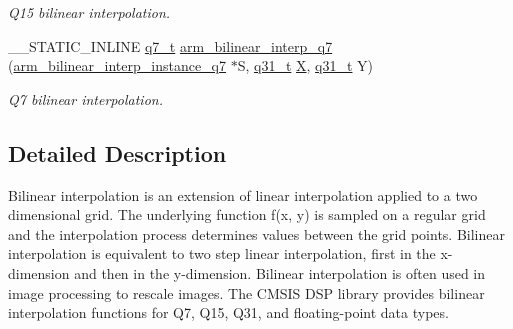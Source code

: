 \begin{DoxyCompactItemize}
\begin{DoxyCompactList}\small\item\em Q15 bilinear interpolation. \end{DoxyCompactList}\item 
\-\_\-\-\_\-\-S\-T\-A\-T\-I\-C\-\_\-\-I\-N\-L\-I\-N\-E \hyperlink{arm__math_8h_ae541b6f232c305361e9b416fc9eed263}{q7\-\_\-t} \hyperlink{group___bilinear_interpolate_ga71d69acab8ce8cfe7b83710619304ca8}{arm\-\_\-bilinear\-\_\-interp\-\_\-q7} (\hyperlink{structarm__bilinear__interp__instance__q7}{arm\-\_\-bilinear\-\_\-interp\-\_\-instance\-\_\-q7} $\ast$S, \hyperlink{arm__math_8h_adc89a3547f5324b7b3b95adec3806bc0}{q31\-\_\-t} \hyperlink{group___i_n_s_g_p_s_ga878335db1805364cefebddb5eccfc282}{X}, \hyperlink{arm__math_8h_adc89a3547f5324b7b3b95adec3806bc0}{q31\-\_\-t} Y)
\begin{DoxyCompactList}\small\item\em Q7 bilinear interpolation. \end{DoxyCompactList}\end{DoxyCompactItemize}


\subsection{Detailed Description}
Bilinear interpolation is an extension of linear interpolation applied to a two dimensional grid. The underlying function {\ttfamily f(x, y)} is sampled on a regular grid and the interpolation process determines values between the grid points. Bilinear interpolation is equivalent to two step linear interpolation, first in the x-\/dimension and then in the y-\/dimension. Bilinear interpolation is often used in image processing to rescale images. The C\-M\-S\-I\-S D\-S\-P library provides bilinear interpolation functions for Q7, Q15, Q31, and floating-\/point data types.

